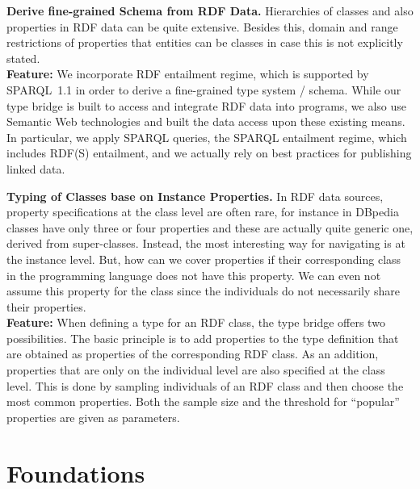 \documentclass{llncs} %
\begin{document}
\vspace{0.6em}
\noindent
\textbf{Derive fine-grained Schema from RDF Data.}
Hierarchies of classes and also properties in RDF data can be quite extensive.
Besides this, domain and range restrictions of properties that entities can be classes
in case this is not explicitly stated. \\
\textbf{Feature:} We incorporate RDF entailment regime, which is supported by SPARQL~1.1
in order to derive a fine-grained type system / schema.
While our type bridge is built to access and integrate RDF data into programs,
we also use Semantic Web technologies and built the data access upon
these existing means. In particular, we apply SPARQL queries, the SPARQL entailment regime, which
includes RDF(S) entailment, and we actually rely on best practices for publishing linked data.

\vspace{0.6em}
\noindent
\textbf{Typing of Classes base on Instance Properties.}
In RDF data sources, property specifications at the class level are often rare,
for instance in DBpedia classes have only three or four properties and these are actually
quite generic one, derived from super-classes. Instead, the most interesting way for navigating
is at the instance level. But, how can we cover properties if their corresponding class
in the programming language does not have this property. We can even not assume this property
for the class since the individuals do not necessarily share their properties. \\
\textbf{Feature:}  When defining a type for an RDF class, the type bridge offers two
possibilities. The basic principle is to add properties to the type definition that
are obtained as properties of the corresponding RDF class. As an addition,
properties that are only on the individual level are also specified at the class level.
This is done by sampling individuals of an RDF class and then choose the most common properties.
Both the sample size and the threshold for ``popular'' properties are given as parameters.




\section{Foundations}

\end{document}
